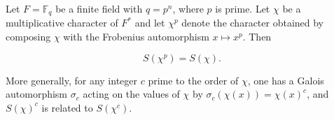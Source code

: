 Let $F = \mathbb{F}_q$ be a finite field with $q = p^n$, where $p$ is prime. Let $\chi$ be a multiplicative character of $F^*$ and let $\chi^p$ denote the character obtained by composing $\chi$ with the Frobenius automorphism $x \mapsto x^p$. Then

$$S(\chi^p) = S(\chi).$$

More generally, for any integer $c$ prime to the order of $\chi$, one has a Galois automorphism $\sigma_c$ acting on the values of $\chi$ by $\sigma_c(\chi(x)) = \chi(x)^c$, and $S(\chi)^c$ is related to $S(\chi^c)$.
